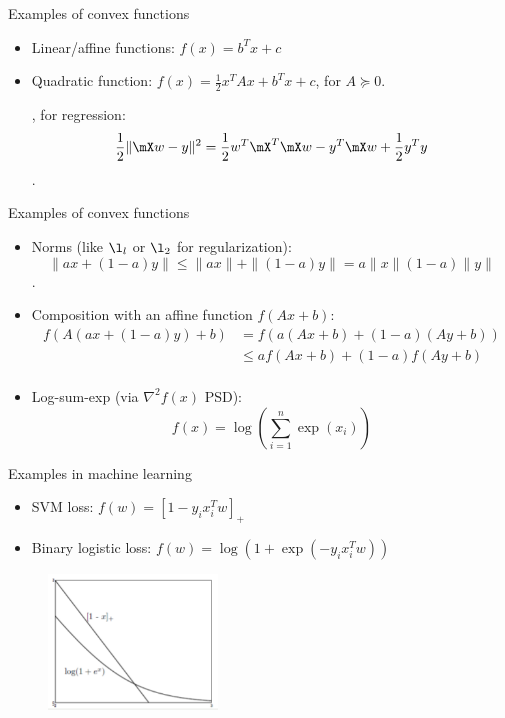 \documentclass[notes]{beamer}
\begin{document}
\begin{frame}
	{Examples of convex functions} 
	\begin{itemize}
		\item Linear/affine functions: $f(x)=b^Tx +c$ 
		\item Quadratic function: $f(x)=\frac{1}{2}x^TAx+b^Tx+c $, for $A\succeq 0$. 
		
		\eg, for regression:  \[\frac{1}{2}\|\mX w-y\|^2 = \frac{1}{2} w^{T} \mX ^T \mX w -y^T \mX w + \frac{1}{2} y^T y \].
		 
	\end{itemize}
\end{frame}
\begin{frame}
	{Examples of convex functions} 
	\begin{itemize}
		 
		\item Norms (like $\l_l$ or $\l_2$ for regularization): 
		\[ \|ax+(1-a)y\|\le \|ax\| +\|(1-a)y\| = a\|x\| (1-a) \|y\| \]. 
		\item Composition with an affine function $f(Ax+b)$: 
		\begin{equation*}
			\begin{aligned}
				f(A(ax+(1-a)y)+b) & = f( a(Ax+b) + (1-a) (Ay+b)) \\
				& \le af(Ax+b) + (1-a) f(Ay+b) \\ 
			\end{aligned}
		\end{equation*} 
		\item Log-sum-exp (via $\nabla^2 f(x)$ PSD): $$f(x)=\log \left(\sum_{i=1}^{n} \exp(x_i) \right)$$		 
	\end{itemize}
\end{frame}

\begin{frame}
	{Examples in machine learning} 
	\begin{itemize}
		\item SVM loss: $f(w) = [1-y_i x_i^T w]_+ $
		\item Binary logistic loss: $f(w)=\log ( 1+ \exp ( -y_i  x_i ^T w ))$ 
	\end{itemize}
	\begin{figure}
		\includegraphics[width=0.4\textwidth]{2018-03-05-11-53-58.png} 
		\end{figure}
	
\end{frame}
\end{document}
